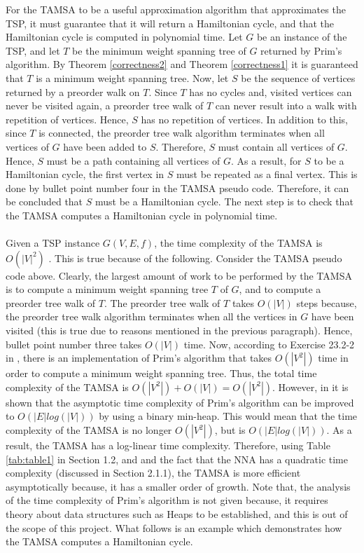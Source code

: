 \documentclass[12pt]{article}
\numberwithin{equation}{subsection}
\numberwithin{table}{subsection}
\numberwithin{algorithm}{subsection}
\begin{document}
For the TAMSA to be a useful approximation algorithm that approximates the TSP, it must guarantee that it will return a Hamiltonian cycle, and that the Hamiltonian cycle is computed in polynomial time. Let $G$ be an instance of the TSP, and let $T$ be the minimum weight spanning tree of $G$ returned by Prim's algorithm. By Theorem \ref{correctness2} and Theorem \ref{correctness1} it is guaranteed that $T$ is a minimum weight spanning tree. Now, let $S$ be the sequence of vertices returned by a preorder walk on $T$. Since $T$ has no cycles and, visited vertices can never be visited again, a preorder tree walk of $T$ can never result into a walk with repetition of vertices. Hence, $S$ has no repetition of vertices. In addition to this, since $T$ is connected, the preorder tree walk algorithm terminates when all vertices of $G$ have been added to $S$. Therefore, $S$ must contain all vertices of $G$. Hence, $S$ must be a path containing all vertices of $G$. As a result, for $S$ to be a Hamiltonian cycle, the first vertex in $S$ must be repeated as a final vertex. This is done by bullet point number four in the TAMSA pseudo code. Therefore, it can be concluded that $S$ must be a Hamiltonian cycle. The next step is to check that the TAMSA computes a Hamiltonian cycle in polynomial time.\\\\
Given a TSP instance $G(V,E,f)$, the time complexity of the TAMSA is $O(|V|^2)$ \cite{cormen_leiserson_rivest_stein}. This is true because of the following. Consider the TAMSA pseudo code above. Clearly, the largest amount of work to be performed by the TAMSA is to compute a minimum weight spanning tree $T$ of $G$, and to compute a preorder tree walk of $T$. The preorder tree walk of $T$ takes $O(|V|)$ steps because, the preorder tree walk algorithm terminates when all the vertices in $G$ have been visited (this is true due to reasons mentioned in the previous paragraph). Hence, bullet point number three takes $O(|V|)$ time. Now, according to Exercise 23.2-2 in \cite{cormen_leiserson_rivest_stein}, there is an implementation of Prim's algorithm that takes $O(|V^2|)$ time in order to compute a minimum weight spanning tree. Thus, the total time complexity of the TAMSA is $O(|V^2|)+ O(|V|) = O(|V^2|)$. However, in \cite{cormen_leiserson_rivest_stein} it is shown that the asymptotic time complexity of Prim's algorithm can be improved to $O(|E| log(|V|))$ by using a binary min-heap. This would mean that the time complexity of the TAMSA is no longer $O(|V^2|)$, but is $O(|E| log(|V|))$. As a result, the TAMSA has a log-linear time complexity. Therefore, using Table \ref{tab:table1} in Section 1.2, and and the fact that the NNA has a quadratic time complexity (discussed in Section 2.1.1), the TAMSA is more efficient asymptotically because, it has a smaller order of growth. Note that, the analysis of the time complexity of Prim's algorithm is not given because, it requires theory about data structures such as Heaps to be established, and this is out of the scope of this project. What follows is an example which demonstrates how the TAMSA computes a Hamiltonian cycle.
\end{document}
